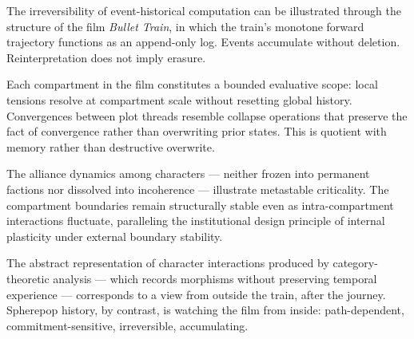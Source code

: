 \documentclass[11pt]{article}
\theoremstyle{remark}
\begin{document}
The irreversibility of event-historical computation can be illustrated through the structure of the film \emph{Bullet Train}, in which the train's monotone forward trajectory functions as an append-only log. Events accumulate without deletion. Reinterpretation does not imply erasure.

Each compartment in the film constitutes a bounded evaluative scope: local tensions resolve at compartment scale without resetting global history. Convergences between plot threads resemble collapse operations that preserve the fact of convergence rather than overwriting prior states. This is quotient with memory rather than destructive overwrite.

The alliance dynamics among characters — neither frozen into permanent factions nor dissolved into incoherence — illustrate metastable criticality. The compartment boundaries remain structurally stable even as intra-compartment interactions fluctuate, paralleling the institutional design principle of internal plasticity under external boundary stability.

The abstract representation of character interactions produced by category-theoretic analysis — which records morphisms without preserving temporal experience — corresponds to a view from outside the train, after the journey. Spherepop history, by contrast, is watching the film from inside: path-dependent, commitment-sensitive, irreversible, accumulating.
\end{document}

